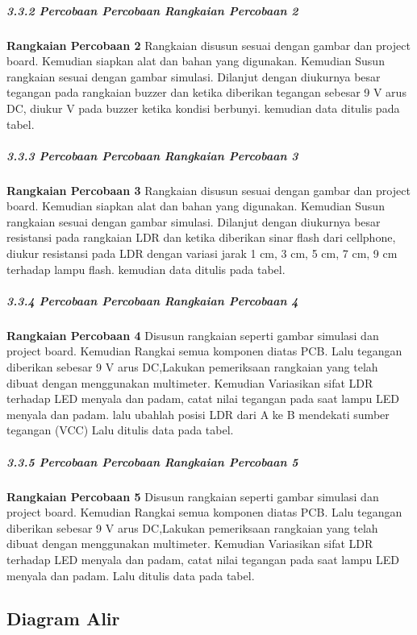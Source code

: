 \documentclass[12pt,a4paper]{article}
\begin{document}
\subparagraph{3.3.2 Percobaan Percobaan Rangkaian Percobaan 2 }
\subparagraph{ }
	\textbf{Rangkaian Percobaan 2} Rangkaian disusun sesuai dengan gambar dan project board. Kemudian siapkan alat dan bahan yang digunakan. Kemudian Susun rangkaian sesuai dengan gambar simulasi. Dilanjut dengan diukurnya besar tegangan pada rangkaian buzzer dan ketika diberikan tegangan sebesar 9 V arus DC, diukur  V pada buzzer ketika kondisi berbunyi. kemudian data ditulis pada tabel.
	
\subparagraph{3.3.3 Percobaan Percobaan Rangkaian Percobaan 3}
\subparagraph{ }
	\textbf{Rangkaian Percobaan 3} Rangkaian disusun sesuai dengan gambar dan project board. Kemudian siapkan alat dan bahan yang digunakan. Kemudian Susun rangkaian sesuai dengan gambar simulasi. Dilanjut dengan diukurnya besar resistansi pada rangkaian LDR dan ketika diberikan sinar flash dari cellphone, diukur  resistansi pada LDR dengan variasi jarak 1 cm, 3 cm, 5 cm, 7 cm, 9 cm terhadap lampu flash. kemudian data ditulis pada tabel.
	
\subparagraph{3.3.4 Percobaan Percobaan Rangkaian Percobaan 4}
\subparagraph{ }
	\textbf{Rangkaian Percobaan 4} Disusun rangkaian seperti gambar simulasi dan project board. Kemudian Rangkai semua komponen diatas PCB. Lalu tegangan diberikan sebesar 9 V arus DC,Lakukan pemeriksaan rangkaian yang telah dibuat dengan menggunakan multimeter. Kemudian Variasikan sifat LDR terhadap LED menyala dan padam, catat nilai tegangan pada saat lampu LED menyala dan padam. lalu ubahlah posisi LDR dari A ke B mendekati sumber tegangan (VCC)  Lalu ditulis data pada tabel.
	
\subparagraph{3.3.5 Percobaan Percobaan Rangkaian Percobaan 5}
\subparagraph{ }
	\textbf{Rangkaian Percobaan 5} Disusun rangkaian seperti gambar simulasi dan project board. Kemudian Rangkai semua komponen diatas PCB. Lalu tegangan diberikan sebesar 9 V arus DC,Lakukan pemeriksaan rangkaian yang telah dibuat dengan menggunakan multimeter. Kemudian Variasikan sifat LDR terhadap LED menyala dan padam, catat nilai tegangan pada saat lampu LED menyala dan padam. Lalu ditulis data pada tabel.

\subsection{Diagram Alir}
\end{document}

